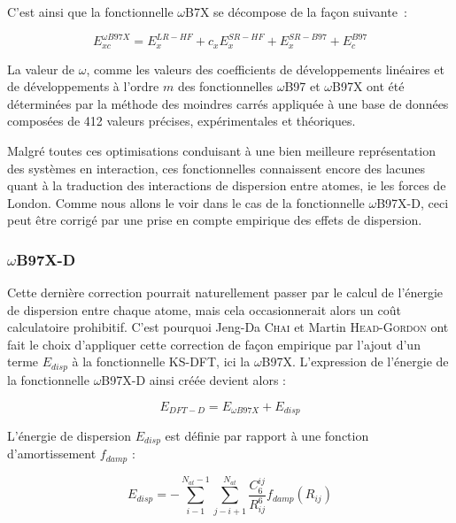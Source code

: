 	C'est ainsi que la fonctionnelle $\omega$B7X\cite{chai2008long} se décompose de la façon suivante~:
	
	\begin{equation}
	E_{xc}^{\omega B97X} = E_{x}^{LR-HF} + c_{x}E_{x}^{SR-HF} + E_{x}^{SR-B97} + E_{c}^{B97}
	\end{equation}
	
	La valeur de $\omega$, comme les valeurs des coefficients de développements linéaires et de développements à l'ordre $m$ des fonctionnelles $\omega$B97 et $\omega$B97X ont été déterminées par la méthode des moindres carrés appliquée à une base de données composées de 412 valeurs précises, expérimentales et théoriques.
	
	Malgré toutes ces optimisations conduisant à une bien meilleure représentation des systèmes en interaction, ces fonctionnelles connaissent encore des lacunes quant à la traduction des interactions de dispersion entre atomes, ie les forces de London. Comme nous allons le voir dans le cas de la fonctionnelle $\omega$B97X-D, ceci peut être corrigé par une prise en compte empirique des effets de dispersion.
	
	\subsubsection{$\omega$B97X-D}
	
	Cette dernière correction pourrait naturellement passer par le calcul de l'énergie de dispersion entre chaque atome, mais cela occasionnerait alors un coût calculatoire prohibitif. C'est pourquoi Jeng-Da \textsc{Chai} et Martin \textsc{Head-Gordon} ont fait le choix d'appliquer cette correction de façon empirique par l'ajout d'un terme $E_{disp}$ à la fonctionnelle KS-DFT, ici la $\omega$B97X. L'expression de l'énergie de la fonctionnelle $\omega$B97X-D \cite{chai2008long} ainsi créée devient alors :
	
	\begin{equation}
	E_{DFT-D}=E_{\omega B97X}+E_{disp}
	\end{equation}
	
	L'énergie de dispersion $E_{disp}$ est définie par rapport à une fonction d'amortissement $f_{damp}$ :
	
	\begin{equation}
	E_{disp}=-\sum_{i-1}^{N_{at}-1} \sum_{j-i+1}^{N_{at}} \frac{C_{6}^{ij}}{R_{ij}^{6}}f_{damp} (R_{ij})
	\end{equation}
	
